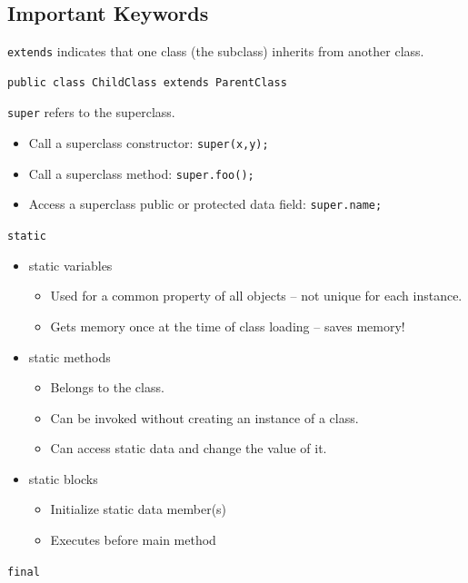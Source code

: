\documentclass[letterpaper,12pt]{article}
\begin{document}
\subsection{Important Keywords}
\texttt{extends} indicates that one class (the subclass) inherits from another class.
\begin{verbatim}
public class ChildClass extends ParentClass
\end{verbatim}
\texttt{super} refers to the superclass.
\begin{itemize}
    \item Call a superclass constructor: \texttt{super(x,y);}
    \item Call a superclass method: \texttt{super.foo();}
    \item Access a superclass public or protected data field: \texttt{super.name;}
\end{itemize}
\texttt{static}
\begin{itemize}
    \item static variables
    \begin{itemize}
        \item Used for a common property of all objects – not unique for each instance.
        \item Gets memory once at the time of class loading – saves memory!
    \end{itemize}
    \item static methods
    \begin{itemize}
        \item Belongs to the class.
        \item Can be invoked without creating an instance of a class.
        \item Can access static data and change the value of it.
    \end{itemize}
    \item static blocks
    \begin{itemize}
        \item Initialize static data member(s)
        \item Executes before main method
    \end{itemize}
\end{itemize}
\texttt{final}
\end{document}
